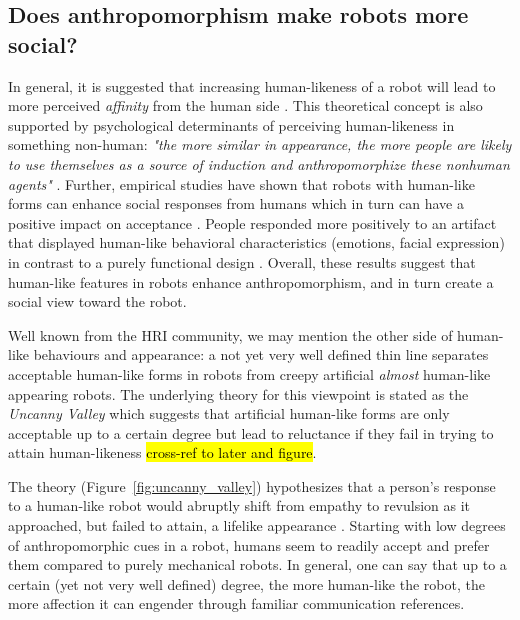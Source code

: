 \documentclass{frontiersSCNS} %
\begin{document}
%
%
%
%
%
%


\subsection{Does anthropomorphism make robots more social?}
\label{sec:more_social}

In general, it is suggested that increasing human-likeness of a robot	 will
lead to more perceived \textit{affinity} from the human side
\cite{mori_uncanny_1970}. This theoretical concept is also supported by
psychological determinants of perceiving human-likeness in something non-human:
\textit{"the more similar in appearance, the more people are likely to use
themselves as a source of induction and anthropomorphize these nonhuman agents"}
\cite{epley_seeing_2007}. Further, empirical studies have shown that robots with
human-like forms can enhance social responses from humans which in turn can have
a positive impact on acceptance
\cite{venkatesh_theoretical_2000,duffy_anthropomorphism_2003,goetz_cooperation_2002}.
People responded more positively to an artifact that displayed human-like
behavioral characteristics (emotions, facial expression) in contrast to a purely
functional design
\cite{eyssel_anthropomorphic_2010,krach_can_2008,reeves_media_1996,riek_how_2009}.
Overall, these results suggest that human-like features in robots enhance
anthropomorphism, and in turn create a social view toward the robot.

Well known from the HRI community, we may mention the other side of human-like
behaviours and appearance: a not yet very well defined thin line separates
acceptable human-like forms in robots from creepy artificial \textit{almost}
human-like appearing robots. The underlying theory for this viewpoint is stated
as the \textit{Uncanny Valley} \cite{mori_uncanny_1970} which suggests that
artificial human-like forms are only acceptable up to a certain degree but lead
to reluctance if they fail in trying to attain human-likeness \hl{cross-ref to
later and figure}.

The theory (Figure~\ref{fig:uncanny_valley}) hypothesizes that a person's
response to a human-like robot would abruptly shift from empathy to revulsion as
it approached, but failed to attain, a lifelike appearance
\cite{mori_uncanny_1970}. Starting with low degrees of anthropomorphic cues in a
robot, humans seem to readily accept and prefer them compared to purely
mechanical robots. In general, one can say that up to a certain (yet not very
well defined) degree, the more human-like the robot, the more affection it can
engender through familiar communication references.
\end{document}
